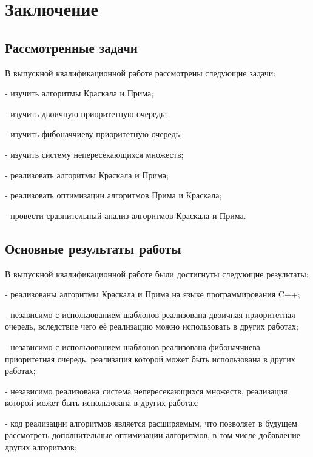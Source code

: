 	\newpage
	
	\section{Заключение}
	
	\subsection{Рассмотренные задачи}
	
	\hspace{0.5 cm}
	
	В выпускной квалификационной работе рассмотрены следующие задачи:
	
	- изучить алгоритмы Краскала и Прима;
	
	- изучить двоичную приоритетную очередь;
	
	- изучить фибоначчиеву приоритетную очередь;
	
	- изучить систему непересекающихся множеств;
	
	- реализовать алгоритмы Краскала и Прима;
	
	- реализовать оптимизации алгоритмов Прима и Краскала;
	
	- провести сравнительный анализ алгоритмов Краскала и Прима.
	
	\subsection{Основные результаты работы}
	
	\hspace{0.5 cm}
	
	В выпускной квалификационной работе были достигнуты следующие результаты:
	
	- реализованы алгоритмы Краскала и Прима на языке программирования C++;
	
	- независимо с использованием шаблонов реализована двоичная приоритетная очередь, вследствие чего её реализацию можно использовать в других работах;
	
	- независимо с использованием шаблонов реализована фибоначчиева приоритетная очередь, реализация которой может быть использована в других работах;
	
	- независимо реализована система непересекающихся множеств, реализация которой может быть использована в других работах;
	
	- код реализации алгоритмов является расширяемым, что позволяет в будущем рассмотреть дополнительные оптимизации алгоритмов, в том числе добавление других алгоритмов;
	
